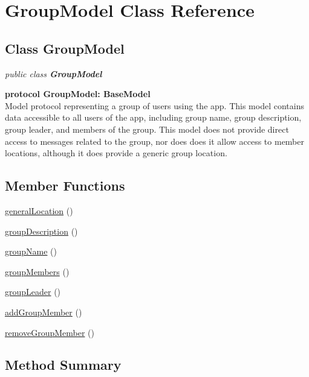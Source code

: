 
\hypertarget{class_GroupModel.iOS}{\section{GroupModel Class Reference}
\label{class_GroupModel.iOS}
}

\subsection*{Class GroupModel}

\textit{public class \textbf{GroupModel}}

\tab \textbf{protocol GroupModel: BaseModel}\\

Model protocol representing a group of users using the app. This model contains data accessible to all users of the app, including group name, group description, group leader, and members of the group. This model does not provide direct access to messages related to the group, nor does does it allow access to member locations, although it does provide a generic group location.\\



\subsection*{Member Functions}
\begin{DoxyCompactItemize}
\item 
\hyperlink{class_GroupModel.iOS.generalLocation}{generalLocation} ()
\item 
\hyperlink{class_GroupModel.iOS.groupDescription}{groupDescription} ()
\item 
\hyperlink{class_GroupModel.iOS.groupName}{groupName} ()
\item 
\hyperlink{class_GroupModel.iOS.groupMembers}{groupMembers} ()
\item 
\hyperlink{class_GroupModel.iOS.groupLeader}{groupLeader} ()
\item 
\hyperlink{class_GroupModel.iOS.addGroupMember}{addGroupMember} ()
\item 
\hyperlink{class_GroupModel.iOS.removeGroupMember}{removeGroupMember} ()
\end{DoxyCompactItemize}




\subsection{Method Summary}


